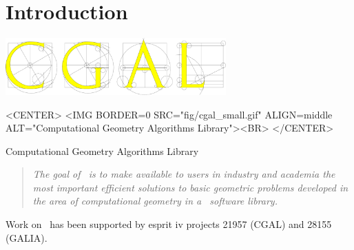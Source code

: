 
\chapter{Introduction\label{chap:intro}}

\begin{ccTexOnly}
\begin{center}
  \includegraphics[width=240pt]{Developers_manual/fig/cgal}
\end{center}
\end{ccTexOnly}

\begin{ccHtmlOnly}
<CENTER>
<IMG BORDER=0 SRC="fig/cgal_small.gif" 
  ALIGN=middle ALT="Computational Geometry Algorithms Library"><BR>
</CENTER>
\end{ccHtmlOnly}
\centerline{{\sc Computational Geometry Algorithms Library}}


\begin{quote}
{\em The goal of \cgal\ is to make available to users in industry and academia
the most important efficient solutions to basic geometric problems
developed in the area of computational geometry in a \CC\ software library.}
\end{quote}

Work on \cgal\ has been supported by {\sc esprit iv} projects 21957 (CGAL) and
28155 (GALIA).


\InternalOnly{

}







